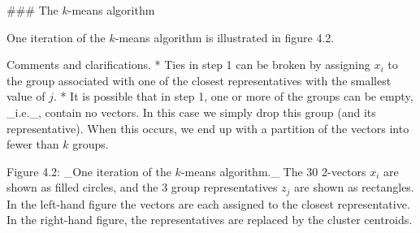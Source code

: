 

### The \(k\)-means algorithm

One iteration of the \(k\)-means algorithm is illustrated in figure 4.2.

Comments and clarifications.
* Ties in step 1 can be broken by assigning \(x_{i}\) to the group associated with one of the closest representatives with the smallest value of \(j\).
* It is possible that in step 1, one or more of the groups can be empty, _i.e._, contain no vectors. In this case we simply drop this group (and its representative). When this occurs, we end up with a partition of the vectors into fewer than \(k\) groups.

Figure 4.2: _One iteration of the \(k\)-means algorithm._ The 30 2-vectors \(x_{i}\) are shown as filled circles, and the 3 group representatives \(z_{j}\) are shown as rectangles. In the left-hand figure the vectors are each assigned to the closest representative. In the right-hand figure, the representatives are replaced by the cluster centroids.

